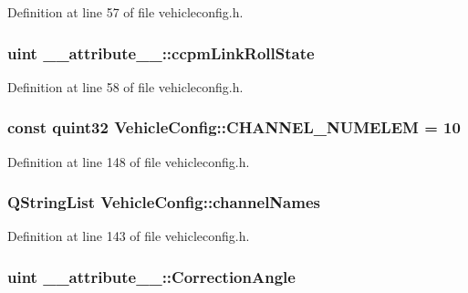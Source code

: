 \-Definition at line 57 of file vehicleconfig.\-h.

\hypertarget{group___config_plugin_gaecc16f8488db13ba16c2c6e1d0053239}{
\subsubsection[{ccpm\-Link\-Roll\-State}]{\setlength{\rightskip}{0pt plus 5cm}uint {\bf \-\_\-\-\_\-attribute\-\_\-\-\_\-\-::ccpm\-Link\-Roll\-State}}}\label{group___config_plugin_gaecc16f8488db13ba16c2c6e1d0053239}


\-Definition at line 58 of file vehicleconfig.\-h.

\hypertarget{group___config_plugin_ga1d29d6e305c146323af055bb3657059f}{
\subsubsection[{\-C\-H\-A\-N\-N\-E\-L\-\_\-\-N\-U\-M\-E\-L\-E\-M}]{\setlength{\rightskip}{0pt plus 5cm}const quint32 {\bf \-Vehicle\-Config\-::\-C\-H\-A\-N\-N\-E\-L\-\_\-\-N\-U\-M\-E\-L\-E\-M} = 10}}\label{group___config_plugin_ga1d29d6e305c146323af055bb3657059f}


\-Definition at line 148 of file vehicleconfig.\-h.

\hypertarget{group___config_plugin_gaca881ae0a25d7e063b68a36b2f5576bf}{
\subsubsection[{channel\-Names}]{\setlength{\rightskip}{0pt plus 5cm}\-Q\-String\-List {\bf \-Vehicle\-Config\-::channel\-Names}}}\label{group___config_plugin_gaca881ae0a25d7e063b68a36b2f5576bf}


\-Definition at line 143 of file vehicleconfig.\-h.

\hypertarget{group___config_plugin_ga9540a6905aee7cc229adfd3bd687b86a}{
\subsubsection[{\-Correction\-Angle}]{\setlength{\rightskip}{0pt plus 5cm}uint {\bf \-\_\-\-\_\-attribute\-\_\-\-\_\-\-::\-Correction\-Angle}}}\label{group___config_plugin_ga9540a6905aee7cc229adfd3bd687b86a}


